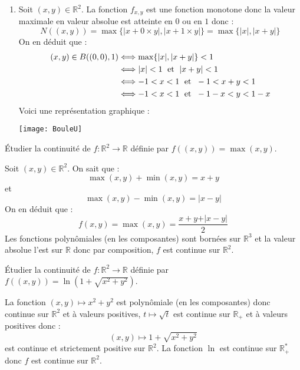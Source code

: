 \documentclass[a4paper,10pt]{report}
\begin{document}
\begin{enumerate}
\item Soit $(x,y) \in \mathbb{R}^2$. La fonction $f_{x,y}$ est une fonction monotone donc la valeur maximale en valeur absolue est atteinte en $0$ ou en $1$ donc :
$$ N((x,y)) = \max \lbrace \vert x+ 0 \times y \vert, \vert x+ 1 \times y \vert \rbrace = \max \lbrace \vert x \vert, \vert x+y \vert \rbrace$$
On en déduit que :
\begin{align*}
(x,y) \in B((0,0),1) & \Longleftrightarrow \max \lbrace \vert x \vert, \vert x+y \vert \rbrace <1 \\
& \Longleftrightarrow \vert x \vert < 1 \; \hbox{ et } \; \vert x+y \vert < 1 \\
& \Longleftrightarrow -1 <x<1 \; \hbox{ et } \;  -1 < x+y<1 \\
& \Longleftrightarrow - 1<x<1 \; \hbox{ et } \; -1-x <y <1-x
\end{align*}
Voici une représentation graphique :

\medskip

\begin{center}
\texttt{[image: BouleU]}
\end{center}
\end{enumerate}

\begin{Exa} Étudier la continuité de $f : \mathbb{R}^2 \rightarrow \mathbb{R}$ définie par $ f((x,y))=  \max(x,y)$.
\end{Exa}

\corr Soit $(x,y) \in \mathbb{R}^2$. On sait que :
$$ \max(x,y)+ \min(x,y) = x+y$$
et 
$$ \max(x,y)-\min(x,y) = \vert x-y \vert$$
On en déduit que :
$$ f(x,y)= \max(x,y) = \dfrac{x+y+ \vert x-y \vert}{2}$$
Les fonctions polynômiales (en les composantes) sont bornées sur $\mathbb{R}^3$ et la valeur absolue l'est sur $\mathbb{R}$ donc par composition, $f$ est continue sur $\mathbb{R}^2$.

\begin{Exa} Étudier la continuité de $f : \mathbb{R}^2 \rightarrow \mathbb{R}$ définie par $f((x,y))= \ln(1 + \sqrt{x^2+y^2})$.
\end{Exa}

\corr La fonction $(x,y) \mapsto x^2+y^2$ est polynômiale (en les composantes) donc continue sur $\mathbb{R}^2$ et à valeurs positives, $t \mapsto \sqrt{t}$ est continue sur $\mathbb{R}_+$ et à valeurs positives donc :
$$ (x,y) \mapsto 1+ \sqrt{x^2+y^2}$$
est continue et strictement positive sur $\mathbb{R}^2$. La fonction $\ln$ est continue sur $\mathbb{R}_+^{*}$ donc $f$ est continue sur $\mathbb{R}^2$.
\end{document}
